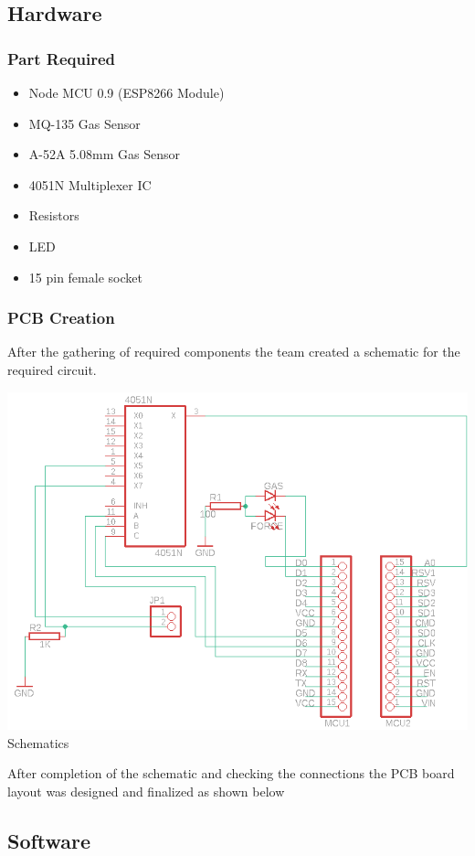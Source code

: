 \documentclass[conference]{IEEEtran}
\newenvironment{Figure}
  {\par\medskip\noindent\minipage{\linewidth}}
  {\endminipage\par\medskip}
\begin{document}
\subsection{Hardware}
\subsubsection{Part Required}
\begin{itemize}
    \item Node MCU 0.9 (ESP8266 Module)
    \item MQ-135 Gas Sensor
    \item A-52A 5.08mm Gas Sensor
    \item 4051N Multiplexer IC
    \item Resistors
    \item LED
    \item 15 pin female socket
\end{itemize}
\subsubsection{PCB Creation}
After the gathering of required components the team created a
schematic for the required circuit.
\begin{Figure}
    \centering
    \includegraphics[width=\linewidth]{Images/Schematic.png}
    \label{scheme}
    \figurename{Schematics}
\end{Figure}
After completion of the schematic and checking the connections the PCB board
layout was designed and finalized as shown below

\subsection{Software}
\end{document}
